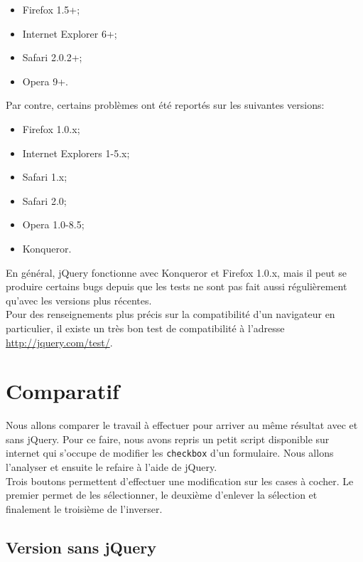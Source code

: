 \documentclass[10pt,a4paper,titlepage]{article}
\begin{document}
\begin{itemize}
	\item {Firefox 1.5+;}
	\item {Internet Explorer 6+;}
	\item {Safari 2.0.2+;}
	\item {Opera 9+.\\}
\end{itemize}

Par contre, certains problèmes ont été reportés sur les suivantes versions:
\begin{itemize}
	\item {Firefox 1.0.x;}
	\item {Internet Explorers 1-5.x;}
	\item {Safari 1.x;}
	\item {Safari 2.0;}
	\item {Opera 1.0-8.5;}
	\item {Konqueror.\\}
\end{itemize}

En général, jQuery fonctionne avec Konqueror et Firefox 1.0.x, mais il peut se produire certains bugs depuis que les tests ne sont pas fait aussi régulièrement qu'avec les versions plus récentes.\\

Pour des renseignements plus précis sur la compatibilité d'un navigateur en particulier, il existe un très bon test de compatibilité à l'adresse \url{http://jquery.com/test/}.

\newpage
\section{Comparatif}

Nous allons comparer le travail à effectuer pour arriver au même résultat avec et sans jQuery. Pour ce faire, nous avons repris un petit script disponible sur internet qui s'occupe de modifier les \texttt{checkbox} d'un formulaire. Nous allons l'analyser et ensuite le refaire à l'aide de jQuery. \\

Trois boutons permettent d'effectuer une modification sur les cases à cocher. Le premier permet de les sélectionner, le deuxième d'enlever la sélection et finalement le troisième de l'inverser. \\

\subsection{Version sans jQuery}
\end{document}
